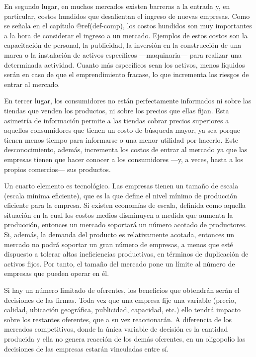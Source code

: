 \documentclass[
  12pt,
  spanish,
]{book}
\begin{document}
En segundo lugar, en muchos mercados existen barreras a la entrada y, en
particular, costos hundidos que desalientan el ingreso de nuevas
empresas. Como se señala en el capítulo @ref(def-comp), los costos
hundidos son muy importantes a la hora de considerar el ingreso a un
mercado. Ejemplos de estos costos son la capacitación de personal, la
publicidad, la inversión en la construcción de una marca o la
instalación de activos específicos ---maquinaria--- para realizar una
determinada actividad. Cuanto más específicos sean los activos, menos
líquidos serán en caso de que el emprendimiento fracase, lo que
incrementa los riesgos de entrar al mercado.

En tercer lugar, los consumidores no están perfectamente informados ni
sobre las tiendas que venden los productos, ni sobre los precios que
ellas fijan. Esta asimetría de información permite a las tiendas cobrar
precios superiores a aquellos consumidores que tienen un costo de
búsqueda mayor, ya sea porque tienen menos tiempo para informarse o una
menor utilidad por hacerlo. Este desconocimiento, además, incrementa los
costos de entrar al mercado ya que las empresas tienen que hacer conocer
a los consumidores ---y, a veces, hasta a los propios comercios--- sus
productos.

Un cuarto elemento es tecnológico. Las empresas tienen un tamaño de
escala (escala mínima eficiente), que es la que define el nivel mínimo
de producción eficiente para la empresa. Si existen economías de escala,
definida como aquella situación en la cual los costos medios disminuyen
a medida que aumenta la producción, entonces un mercado soportará un
número acotado de productores. Si, además, la demanda del producto es
relativamente acotada, entonces un mercado no podrá soportar un gran
número de empresas, a menos que esté dispuesto a tolerar altas
ineficiencias productivas, en términos de duplicación de activos fijos.
Por tanto, el tamaño del mercado pone un límite al número de empresas
que pueden operar en él.

Si hay un número limitado de oferentes, los beneficios que obtendrán
serán el decisiones de las firmas. Toda vez que una empresa fije una
variable (precio, calidad, ubicación geográfica, publicidad, capacidad,
etc.) ello tendrá impacto sobre los restantes oferentes, que a su vez
reaccionarán. A diferencia de los mercados competitivos, donde la única
variable de decisión es la cantidad producida y ella no genera reacción
de los demás oferentes, en un oligopolio las decisiones de las empresas
estarán vinculadas entre sí.
\end{document}
